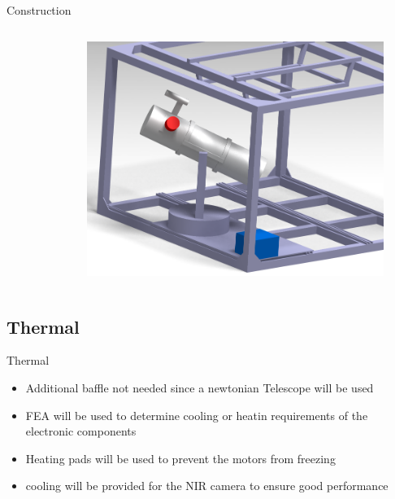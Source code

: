 \documentclass[11pt, aspectratio=169]{beamer}
\begin{document}
\begin{frame}{Construction}
\begin{columns}[t]
\begin{column}{0.3\textwidth}
\begin{figure}
		\end{figure}
	\end{column}
	\begin{column}{0.3\textwidth}
		\begin{figure}
		\centering
		\includegraphics[scale=0.6]{figures/CAD/Assembly_3.png}
		\end{figure}
	\end{column}
\end{columns}
\end{frame}

\subsection{Thermal} 			%
\begin{frame}{Thermal}
\begin{itemize}
	\item Additional baffle not needed since a newtonian Telescope will be used
	\item FEA will be used to determine cooling or heatin requirements of the electronic components
	\item Heating pads will be used to prevent the motors from freezing
	\item cooling will be provided for the NIR camera to ensure good performance
\end{itemize}

\end{frame}
\end{document}
